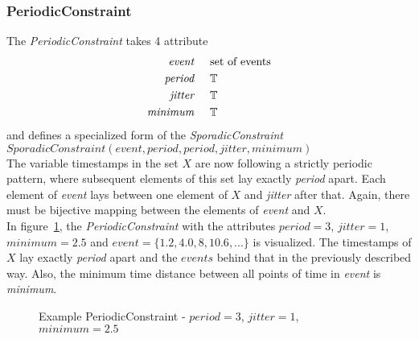 	\subsubsection{PeriodicConstraint}
		The \emph{PeriodicConstraint} takes 4 attribute
		\begin{align*}
			\emph{event} 	& \hspace{.5cm}\text{set of events}\\
			\emph{period} 	& \hspace{.5cm}\mathbb{T}\\
			\emph{jitter}	& \hspace{.5cm}\mathbb{T}\\
			\emph{minimum}	& \hspace{.5cm}\mathbb{T}
		\end{align*}
		and defines a specialized form of the \emph{SporadicConstraint}\\[10pt]
		\begin{math}
			SporadicConstraint(event, period, period, jitter, minimum)
		\end{math}\\[10pt]
		The variable timestamps in the set $X$ are now following a strictly periodic pattern, where subsequent elements of this set lay exactly \emph{period} apart. Each element of \emph{event} lays between one element of $X$ and \emph{jitter} after that. Again, there must be bijective mapping between the elements of \emph{event} and $X$.\\
		In figure~\ref{fig:PeriodicConstraintExample}, the \emph{PeriodicConstraint} with the attributes $period=3$, $jitter=1$, $minimum=2.5$ and $event = \{1.2, 4.0, 8, 10.6, ...\}$ is visualized. The timestamps of $X$ lay exactly \emph{period} apart and the $events$ behind that in the previously described way. Also, the minimum time distance between all points of time in \emph{event} is \emph{minimum}.
		\begin{figure}
			\caption{Example PeriodicConstraint - $period=3$, $jitter=1$, $minimum=2.5$}
			\label{fig:PeriodicConstraintExample}
		\end{figure}
		
